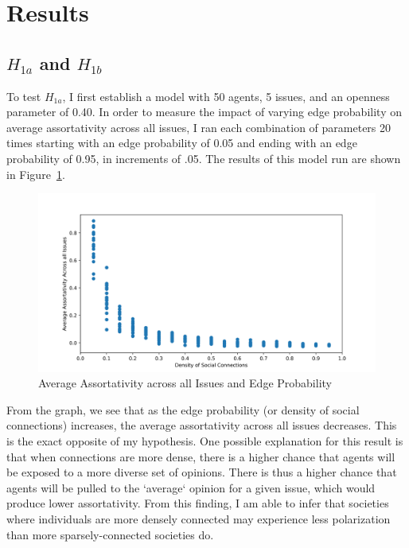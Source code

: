 \section{Results}
\subsection{$H_{1a}$ and $H_{1b}$}

To test $H_{1a}$, I first establish a model with 50 agents, 5 issues, and an
openness parameter of 0.40. In order to measure the impact of varying edge
probability on average assortativity across all issues, I ran each combination
of parameters 20 times starting with an edge probability of 0.05 and ending
with an edge probability of 0.95, in increments of .05. The results of this
model run are shown in Figure~\ref{H1a_plot}.

\begin{figure}
\centering
\includegraphics[width=1.0\columnwidth]{./Graphs/Assort_edge.png}
\caption{Average Assortativity across all Issues and Edge Probability}
\label{H1a_plot}
\end{figure}

From the graph, we see that as the edge probability (or density of social connections)
increases, the average assortativity across all issues decreases. This is the
exact opposite of my hypothesis. One possible explanation for this result is
that when connections are more dense, there is a higher chance that agents will
be exposed to a more diverse set of opinions. There is thus a higher chance
that agents will be pulled to the `average` opinion for a given issue, which
would produce lower assortativity. From this finding, I am able to infer
that societies where individuals are more densely connected may experience
less polarization than more sparsely-connected societies do.

